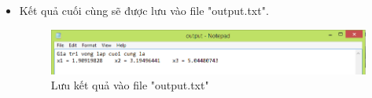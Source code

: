 \documentclass[12pt,a4paper]{article}
\begin{document}
{\begin{itemize}
\begin{itemize}
\item Kết quả cuối cùng sẽ được lưu vào file "output.txt".
\begin{center}
    \begin{figure}[htp]
    \begin{center}
     \includegraphics[scale=.7]{anh_5}
    \end{center}
    \caption{Lưu kết quả vào file "output.txt"}
    \label{refhinh1}
    \end{figure}
\end{center}

\end{itemize}
\end{itemize}

}
\newpage
\end{document}

